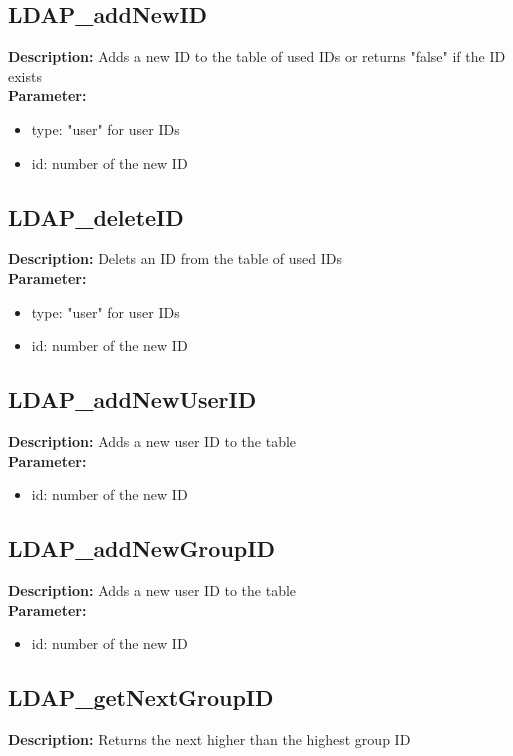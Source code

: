 \subsection{LDAP\_addNewID}
\textbf{Description:} Adds a new ID to the table of used IDs or returns "false" if the ID exists\\
\textbf{Parameter:}
\begin{itemize}
\item type: "user" for user IDs
\item id: number of the new ID
\end{itemize}

\subsection{LDAP\_deleteID}
\textbf{Description:} Delets an ID from the table of used IDs\\
\textbf{Parameter:}
\begin{itemize}
\item type: "user" for user IDs
\item id: number of the new ID
\end{itemize}

\subsection{LDAP\_addNewUserID}
\textbf{Description:} Adds a new user ID to the table\\
\textbf{Parameter:}
\begin{itemize}
\item id: number of the new ID
\end{itemize}

\subsection{LDAP\_addNewGroupID}
\textbf{Description:} Adds a new user ID to the table\\
\textbf{Parameter:}
\begin{itemize}
\item id: number of the new ID
\end{itemize}

\subsection{LDAP\_getNextGroupID}
\textbf{Description:} Returns the next higher than the highest group ID\\

